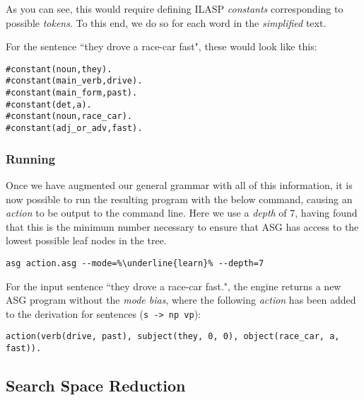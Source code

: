 As you can see, this would require defining ILASP \textit{constants} corresponding to possible \textit{tokens}. To this end, we do so for each word in the \textit{simplified} text.

For the sentence ``they drove a race-car fast", these would look like this:

\begin{displayquote}
\begin{lstlisting}
#constant(noun,they).
#constant(main_verb,drive).
#constant(main_form,past).
#constant(det,a).
#constant(noun,race_car).
#constant(adj_or_adv,fast).
\end{lstlisting}
\end{displayquote}

\subsubsection{Running}

Once we have augmented our general grammar with all of this information, it is now possible to run the resulting program with the below command, causing an \textit{action} to be output to the command line. Here we use a \textit{depth} of 7, having found that this is the minimum number necessary to ensure that ASG has access to the lowest possible leaf nodes in the tree.

\begin{displayquote}
\begin{lstlisting}[numbers=none, escapechar=\%]
asg action.asg --mode=%\underline{learn}% --depth=7
\end{lstlisting}
\end{displayquote}

For the input sentence ``they drove a race-car fast.", the engine returns a new ASG program without the \textit{mode bias}, where the following \textit{action} has been added to the derivation for sentences (\texttt{s -> np vp}):

\begin{displayquote}
\begin{lstlisting}[numbers=none]
action(verb(drive, past), subject(they, 0, 0), object(race_car, a, fast)).
\end{lstlisting}
\end{displayquote}

\subsection{Search Space Reduction}

